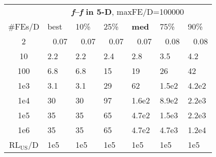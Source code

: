 \begin{tabular}{c|llllll}
 & \multicolumn{6}{|c}{\textbf{\textit{f}\raisebox{-0.35ex}{1}--\textit{f}\raisebox{-0.35ex}{8} in 5-D}, maxFE/D=100000}\\
\#FEs/D & best & 10\% & 25\% & \textbf{med} & 75\% & 90\%\\
2 & ~\,0.07 & ~\,0.07 & ~\,0.07 & ~\,0.07 & ~\,0.08 & ~\,0.08\\
10 & \hspace*{1ex}2.2 & \hspace*{1ex}2.2 & \hspace*{1ex}2.4 & \hspace*{1ex}2.8 & \hspace*{1ex}3.5 & \hspace*{1ex}4.2\\
100 & \hspace*{1ex}6.8 & \hspace*{1ex}6.8 & 15 & 19 & 26 & 42\\
1e3 & \hspace*{1ex}3.1 & \hspace*{1ex}3.1 & 29 & 62 & 1.5e2 & 4.2e2\\
1e4 & 30 & 30 & 97 & 1.6e2 & 8.9e2 & 2.2e3\\
1e5 & 35 & 35 & 65 & 4.7e2 & 1.5e3 & 2.2e3\\
1e6 & 35 & 35 & 65 & 4.7e2 & 4.7e3 & 1.2e4\\
$\text{RL}_{\text{US}}$/D & 1e5 & 1e5 & 1e5 & 1e5 & 1e5 & 1e5
\end{tabular}
